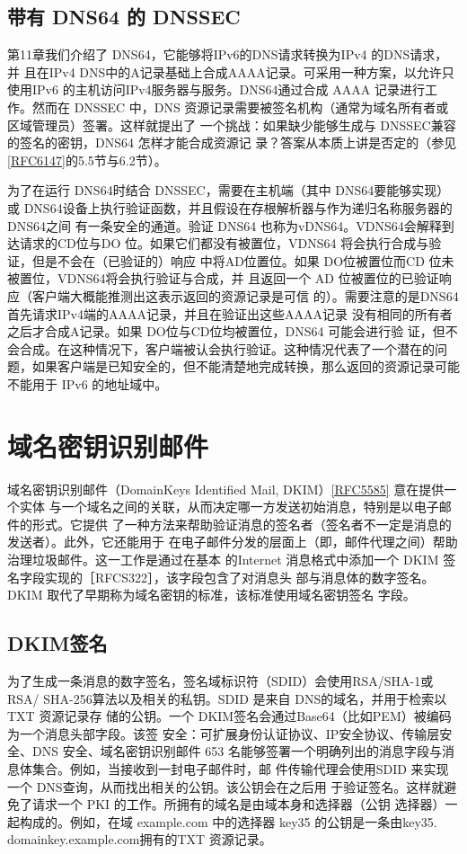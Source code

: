 \subsection{带有 DNS64 的 DNSSEC}
第11章我们介绍了 DNS64，它能够将IPv6的DNS请求转换为IPv4 的DNS请求，并
且在IPv4 DNS中的A记录基础上合成AAAA记录。可采用一种方案，以允许只使用IPv6
的主机访问IPv4服务器与服务。DNS64通过合成 AAAA 记录进行工作。然而在 DNSSEC
中，DNS 资源记录需要被签名机构（通常为域名所有者或区域管理员）签署。这样就提出了
一个挑战：如果缺少能够生成与 DNSSEC兼容的签名的密钥，DNS64 怎样才能合成资源记
录？答案从本质上讲是否定的（参见\href{https://www.rfc-editor.org/rfc/rfc6147}{[RFC6147]}的5.5节与6.2节）。

为了在运行 DNS64时结合 DNSSEC，需要在主机端（其中 DNS64要能够实现）或
DNS64设备上执行验证函数，并且假设在存根解析器与作为递归名称服务器的 DNS64之间
有一条安全的通道。验证 DNS64 也称为vDNS64。VDNS64会解释到达请求的CD位与DO
位。如果它们都没有被置位，VDNS64 将会执行合成与验证，但是不会在（已验证的）响应
中将AD位置位。如果 DO位被置位而CD 位未被置位，VDNS64将会执行验证与合成，并
且返回一个 AD 位被置位的已验证响应（客户端大概能推测出这表示返回的资源记录是可信
的）。需要注意的是DNS64首先请求IPv4端的AAAA记录，并且在验证出这些AAAA记录
没有相同的所有者之后才合成A记录。如果 DO位与CD位均被置位，DNS64 可能会进行验
证，但不会合成。在这种情况下，客户端被认会执行验证。这种情况代表了一个潜在的问
题，如果客户端是已知安全的，但不能清楚地完成转换，那么返回的资源记录可能不能用于
IPv6 的地址域中。

\section{域名密钥识别邮件}
域名密钥识别邮件（DomainKeys Identified Mail, DKIM）\href{https://www.rfc-editor.org/rfc/rfc5585}{[RFC5585]} 意在提供一个实体
与一个域名之间的关联，从而决定哪一方发送初始消息，特别是以电子邮件的形式。它提供
了一种方法来帮助验证消息的签名者（签名者不一定是消息的发送者）。此外，它还能用于
在电子邮件分发的层面上（即，邮件代理之间）帮助治理垃圾邮件。这一工作是通过在基本
的Internet 消息格式中添加一个 DKIM 签名字段实现的［RFCS322］，该字段包含了对消息头
部与消息体的数字签名。DKIM 取代了早期称为域名密钥的标准，该标准使用域名密钥签名
字段。
\subsection{DKIM签名}
为了生成一条消息的数字签名，签名域标识符（SDID）会使用RSA/SHA-1或RSA/
SHA-256算法以及相关的私钥。SDID 是来自 DNS的域名，并用于检索以TXT 资源记录存
储的公钥。一个 DKIM签名会通过Base64（比如PEM）被编码为一个消息头部字段。该签
安全：可扩展身份认证协议、IP安全协议、传输层安全、DNS 安全、域名密钥识别邮件 653
名能够签署一个明确列出的消息字段与消息体集合。例如，当接收到一封电子邮件时，邮
件传输代理会使用SDID 来实现一个 DNS查询，从而找出相关的公钥。该公钥会在之后用
于验证签名。这样就避免了请求一个 PKI 的工作。所拥有的域名是由域本身和选择器（公钥
选择器）一起构成的。例如，在域 example.com 中的选择器 key35 的公钥是一条由key35.
domainkey.example.com拥有的TXT 资源记录。

